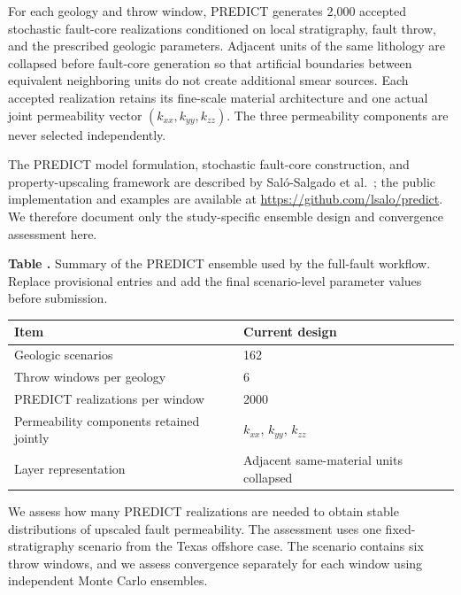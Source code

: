 
\label{sec:si-local-fault-core-modeling}


For each geology and throw window, PREDICT generates 2,000 accepted stochastic
fault-core realizations conditioned on local stratigraphy, fault throw, and
the prescribed geologic parameters. Adjacent units of the same lithology are
collapsed before fault-core generation so that artificial boundaries between
equivalent neighboring units do not create additional smear sources. Each
accepted realization retains its fine-scale material architecture and one
actual joint permeability vector $(k_{xx},k_{yy},k_{zz})$. The three
permeability components are never selected independently.

The PREDICT model formulation, stochastic fault-core construction, and
property-upscaling framework are described by Sal\'o-Salgado et
al.~\cite{SaloSalgado2023,SaloSalgado2025}; the public implementation and
examples are available at \url{https://github.com/lsalo/predict}. We therefore
document only the study-specific ensemble design and convergence assessment
here.

\label{tab:si-predict-ensemble}
\noindent\textbf{Table \thetable.} Summary of the PREDICT ensemble used by the
full-fault workflow. Replace provisional entries and add the final
scenario-level parameter values before submission.
\begin{center}
  \begin{tabular}{@{}ll@{}}
    \toprule
    Item & Current design \\
    \midrule
    Geologic scenarios & 162 \\
    Throw windows per geology & 6 \\
    PREDICT realizations per window & 2000 \\
    Permeability components retained jointly & $k_{xx}$, $k_{yy}$, $k_{zz}$ \\
    Layer representation & Adjacent same-material units collapsed \\
    \bottomrule
  \end{tabular}
\end{center}


We assess how many PREDICT realizations are needed to obtain stable
distributions of upscaled fault permeability. The assessment uses one
fixed-stratigraphy scenario from the Texas offshore case. The scenario contains six
throw windows, and we assess convergence separately for each window using
independent Monte Carlo ensembles.

